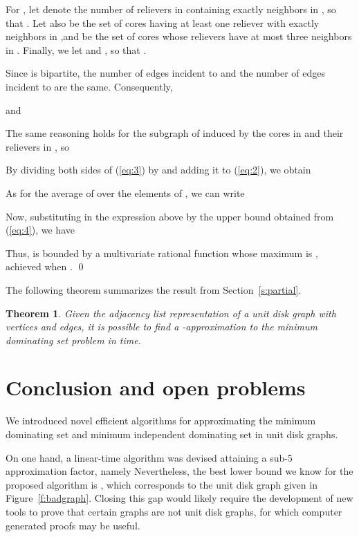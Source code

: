 \documentclass[preprint,12pt]{elsarticle}
\newtheorem{thm}{Theorem}
\begin{document}
\begin{pf}
For , let  denote the number of relievers in  containing exactly  neighbors in , so that . Let also  be the set of cores having at least one reliever with exactly  neighbors in ,\linebreak and  be the set of cores whose relievers have at most three neighbors in . Finally, we let  and , so that .

Since  is bipartite, the number of edges incident to  and the number of edges incident to  are the same. Consequently, 

 and


The same reasoning holds for the subgraph of  induced by the cores \linebreak in  and their relievers in , so

By dividing both sides of (\ref{eq:3}) by  and adding it to (\ref{eq:2}), we obtain

As for the average  of  over the elements of , we can write



Now, substituting  in the expression above by the upper bound obtained from (\ref{eq:4}), we have



Thus,  is bounded by a multivariate rational function whose maximum is , achieved when . 
\qed


\end{pf}

The following theorem summarizes the result from Section~\ref{s:partial}.

\begin{thm} \label{thm:graph-alg-partial}
Given the adjacency list representation of a unit disk graph with  vertices and  edges, it is possible to find a -approximation to the minimum dominating set problem in  time.
\end{thm}


\section{Conclusion and open problems} \label{s:conclusion}

We introduced novel efficient algorithms for approximating the minimum dominating set and minimum independent dominating set in unit disk graphs.

On one hand, a linear-time algorithm was devised attaining a sub-5 approximation factor, namely  Nevertheless, the best lower bound we know for the proposed algorithm is , which corresponds to the unit disk graph given in Figure~\ref{f:badgraph}.
Closing this gap would likely require the development of new tools to prove that certain graphs are not unit disk graphs, for which computer generated proofs may be useful.
\end{document}
